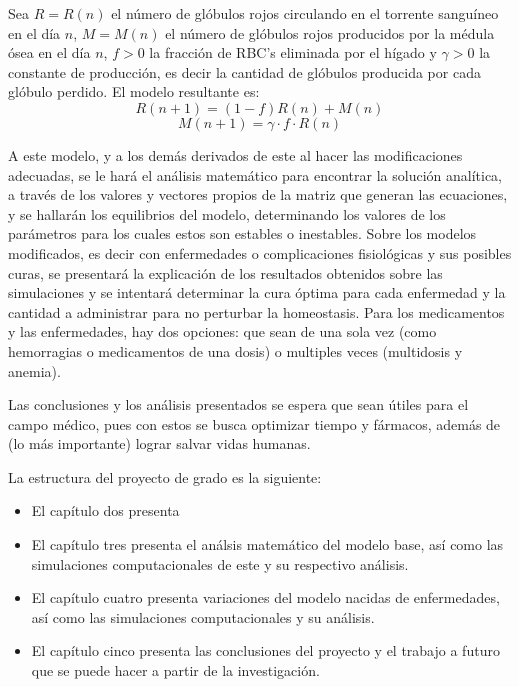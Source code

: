 Sea $R=R(n)$ el número de glóbulos rojos circulando en el torrente sanguíneo en el día $n$, $M=M(n)$ el número de glóbulos rojos producidos por la médula ósea en el día $n$, $f>0$ la fracción de RBC's eliminada por el hígado y $\gamma>0$ la constante de producción, es decir la cantidad de glóbulos producida por cada glóbulo perdido. El modelo resultante es:
$$R(n+1)=(1-f)R(n)+M(n)$$
$$M(n+1)=\gamma \cdot f\cdot R(n)$$

A este modelo, y a los demás derivados de este al hacer las modificaciones adecuadas, se le hará el análisis matemático para encontrar la solución analítica, a través de los valores y vectores propios de la matriz que generan las ecuaciones, y se hallarán los equilibrios del modelo, determinando los valores de los parámetros para los cuales estos son estables o inestables. Sobre los modelos modificados, es decir con enfermedades o complicaciones fisiológicas y sus posibles curas, se presentará la explicación de los resultados obtenidos sobre las simulaciones y se intentará determinar la cura óptima para cada enfermedad y la cantidad a administrar para no perturbar la homeostasis. Para los medicamentos y las enfermedades, hay dos opciones: que sean de una sola vez (como hemorragias o medicamentos de una dosis) o multiples veces (multidosis y anemia).

Las conclusiones y los análisis presentados se espera que sean útiles para el campo médico, pues con estos se busca optimizar tiempo y fármacos, además de (lo más importante) lograr salvar vidas humanas.

La estructura del proyecto de grado es la siguiente:
\begin{itemize}
    \item El capítulo dos presenta
    \item El capítulo tres presenta el análsis matemático del modelo base, así como las simulaciones computacionales de este y su respectivo análisis.
    \item El capítulo cuatro presenta variaciones del modelo nacidas de enfermedades, así como las simulaciones computacionales y su análisis.
    \item El capítulo cinco presenta las conclusiones del proyecto y el trabajo a futuro que se puede hacer a partir de la investigación.
\end{itemize}

